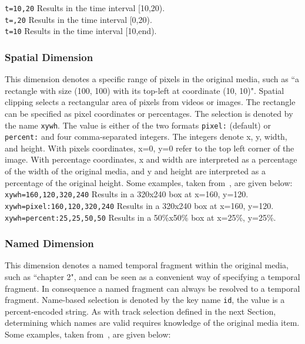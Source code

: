 \documentclass[12pt]{article}
\begin{document}
\texttt{t=10,20} Results in the time interval [10,20).\\
\indent \texttt{t=,20} Results in the time interval [0,20).\\
\indent \texttt{t=10} Results in the time interval [10,end).

\subsubsection{Spatial Dimension}
This dimension denotes a specific range of pixels in the original media, such as ``a rectangle with size (100, 100) with its top-left at coordinate (10, 10)". Spatial clipping selects a rectangular area of pixels from videos or images. The rectangle can be specified as pixel coordinates or percentages. The selection is denoted by the name \texttt{xywh}. The value is either of the two formats \texttt{pixel:} (default) or \texttt{percent:} and four comma-separated integers. The integers denote x, y, width, and height. With pixels coordinates, x=0, y=0 refer to the top left corner of the image. With percentage coordinates, x and width are interpreted as a percentage of the width of the original media, and y and height are interpreted as a percentage of the original height. Some examples, taken from~\cite{W3C:MediaFrags}, are given below:\\

\texttt{xywh=160,120,320,240} Results in a 320x240 box at x=160, y=120.\\
\indent \texttt{xywh=pixel:160,120,320,240} Results in a 320x240 box at x=160, y=120.\\
\indent \texttt{xywh=percent:25,25,50,50} Results in a 50\%x50\% box at x=25\%, y=25\%.

\subsubsection{Named Dimension}
This dimension denotes a named temporal fragment within the original media, such as ``chapter 2", and can be seen as a convenient way of specifying a temporal fragment. In consequence a named fragment can always be resolved to a temporal fragment. Name-based selection is denoted by the key name \texttt{id}, the value is a percent-encoded string. As with track selection defined in the next Section, determining which names are valid requires knowledge of the original media item. Some examples, taken from~\cite{W3C:MediaFrags}, are given below:\\
\end{document}
